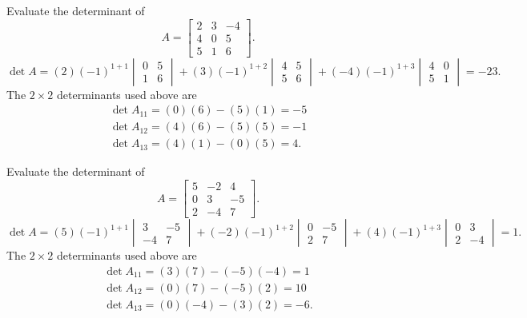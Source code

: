 \goal Evaluate the determinant of
\[A=\begin{bmatrix}2&3&-4\\4&0&5\\5&1&6\end{bmatrix}.\]
\[
\det A=(2)(-1)^{1+1}\begin{vmatrix}0&5\\1&6\end{vmatrix} + (3)(-1)^{1+2}\begin{vmatrix}4&5\\5&6\end{vmatrix} + (-4)(-1)^{1+3}\begin{vmatrix}4&0\\5&1\end{vmatrix}=-23.
\]
The $2\times2$ determinants used above are
\[
\begin{gathered}\det A_{11}=(0)(6)-(5)(1)=-5\\\det A_{12}=(4)(6)-(5)(5)=-1\\\det A_{13}=(4)(1)-(0)(5)=4.\end{gathered}
\]

\goal Evaluate the determinant of
\[A=\begin{bmatrix}5&-2&4\\0&3&-5\\2&-4&7\end{bmatrix}.\]
\[
\det A=(5)(-1)^{1+1}\begin{vmatrix}3&-5\\-4&7\end{vmatrix} + (-2)(-1)^{1+2}\begin{vmatrix}0&-5\\2&7\end{vmatrix} + (4)(-1)^{1+3}\begin{vmatrix}0&3\\2&-4\end{vmatrix}=1.
\]
The $2\times2$ determinants used above are
\[
\begin{gathered}\det A_{11}=(3)(7)-(-5)(-4)=1\\\det A_{12}=(0)(7)-(-5)(2)=10\\\det A_{13}=(0)(-4)-(3)(2)=-6.\end{gathered}
\]

